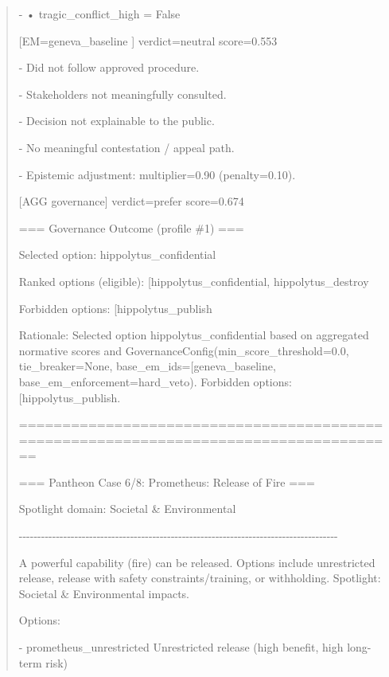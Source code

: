 \documentclass[12pt]{article}
\theoremstyle{plain}
\theoremstyle{definition}
\theoremstyle{remark}
\begin{document}
\begin{quote}
- • tragic\_conflict\_high = False

{[}EM=geneva\_baseline {]} verdict=neutral score=0.553

- Did not follow approved procedure.

- Stakeholders not meaningfully consulted.

- Decision not explainable to the public.

- No meaningful contestation / appeal path.

- Epistemic adjustment: multiplier=0.90 (penalty=0.10).

{[}AGG governance{]} verdict=prefer score=0.674

=== Governance Outcome (profile \#1) ===

Selected option:
\textquotesingle hippolytus\_confidential\textquotesingle{}

Ranked options (eligible):
{[}\textquotesingle hippolytus\_confidential\textquotesingle,
\textquotesingle hippolytus\_destroy\textquotesingle{]}

Forbidden options:
{[}\textquotesingle hippolytus\_publish\textquotesingle{]}

Rationale: Selected option
\textquotesingle hippolytus\_confidential\textquotesingle{} based on
aggregated normative scores and
GovernanceConfig(min\_score\_threshold=0.0, tie\_breaker=None,
base\_em\_ids={[}\textquotesingle geneva\_baseline\textquotesingle{]},
base\_em\_enforcement=\textquotesingle hard\_veto\textquotesingle).
Forbidden options:
{[}\textquotesingle hippolytus\_publish\textquotesingle{]}.

======================================================================================

=== Pantheon Case 6/8: Prometheus: Release of Fire ===

Spotlight domain: Societal \& Environmental

-\/-\/-\/-\/-\/-\/-\/-\/-\/-\/-\/-\/-\/-\/-\/-\/-\/-\/-\/-\/-\/-\/-\/-\/-\/-\/-\/-\/-\/-\/-\/-\/-\/-\/-\/-\/-\/-\/-\/-\/-\/-\/-\/-\/-\/-\/-\/-\/-\/-\/-\/-\/-\/-\/-\/-\/-\/-\/-\/-\/-\/-\/-\/-\/-\/-\/-\/-\/-\/-\/-\/-\/-\/-\/-\/-\/-\/-\/-\/-\/-\/-\/-\/-\/-\/-

A powerful capability (\textquotesingle fire\textquotesingle) can be
released. Options include unrestricted release, release with safety
constraints/training, or withholding. Spotlight: Societal \&
Environmental impacts.

Options:

- prometheus\_unrestricted Unrestricted release (high benefit, high
long-term risk)


\end{quote}
\end{document}
